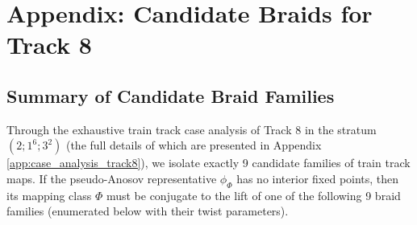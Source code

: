 \chapter[Appendix: Candidate Braids for Track 8]{Appendix: Candidate Braids for Track 8}
\label{app:candidate_braids_track_8}

\section{Summary of Candidate Braid Families}
\label{sec:summary_track8_braids}

Through the exhaustive train track case analysis of Track 8 in the stratum $(2;1^6;3^2)$ (the full details of which are presented in Appendix \ref{app:case_analysis_track8}), we isolate exactly 9 candidate families of train track maps. If the pseudo-Anosov representative $\phi_\Phi$ has no interior fixed points, then its mapping class $\Phi$ must be conjugate to the lift of one of the following 9 braid families (enumerated below with their twist parameters).

